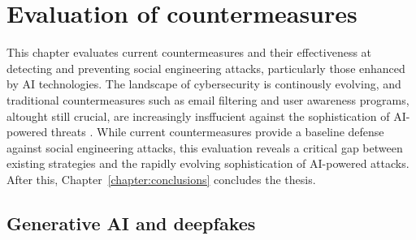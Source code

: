 



\chapter{Evaluation of countermeasures\label{chapter:evaluation}}
\begin{comment}

Guides:
    - Rest of the thesis (thesis max of 20 - other chapters and pages)
    - Fill the thesis with content in this chapter

TODO:
    [ ] 

What to cover:
    - OpenAI attempts to control how ChatGPT etc are used
    - Efficacy of EU and other level regulations
    - Instagram flagging content that might've been generated with AI (this is futile in the future?)
    
Literature:
    - 

\end{comment}

This chapter evaluates current countermeasures and their effectiveness at detecting and preventing social engineering attacks, particularly those enhanced by AI technologies. The landscape of cybersecurity is continously evolving, and traditional countermeasures such as email filtering and user awareness programs, altought still crucial, are increasingly insffucient against the sophistication of AI-powered threats \citep{fakhouriAIDrivenSolutionsForSocialEngineeringAttacks2024}. While current countermeasures provide a baseline defense against social engineering attacks, this evaluation reveals a critical gap between existing strategies and the rapidly evolving sophistication of AI-powered attacks. After this, Chapter~\ref{chapter:conclusions} concludes the thesis.













\section{Generative AI and deepfakes}

\begin{comment}    
    - Deepfake content detection
    - Spear phishing detection
\end{comment}

